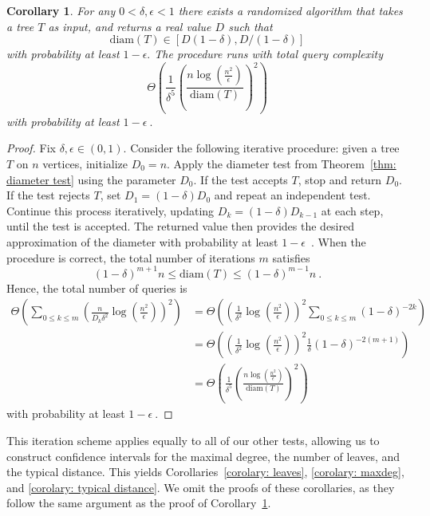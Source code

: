 \documentclass[12pt]{article}
\newtheorem{corollary}[theorem]{Corollary}
\newcommand{\diam}[1]{\mathrm{diam}\!\left(#1\right)}
\begin{document}
\begin{corollary}\label{corolary: diameter}
    For any  $0<\delta,\epsilon<1$ there exists a randomized algorithm that takes a tree $T$ as input, and returns a real value $D$ such that $$\diam{T}\in [D(1-\delta),D/(1-\delta)]$$ with probability at least $1-\epsilon.$ The procedure runs with total query complexity $$\Theta\left(\frac{1}{\delta^5}\left(\frac{n\log(\frac{n^2}{\epsilon})}{\diam{T}}\right)^2\right)$$
    with probability at least $1-\epsilon~.$
\end{corollary}
\begin{proof}
    Fix $\delta,\epsilon \in (0,1)$. Consider the following iterative procedure: given a tree $T$ on $n$ vertices, initialize $D_0 = n$. Apply the diameter test from Theorem~\ref{thm: diameter test} using the parameter $D_0$. If the test accepts $T$, stop and return $D_0$. If the test rejects $T$, set $D_1 = (1-\delta) D_0$ and repeat an independent test. Continue this process iteratively, updating $D_k = (1-\delta) D_{k-1}$ at each step, until the test is accepted. The returned value then provides the desired approximation of the diameter with probability at least $1-\epsilon$~.
    When the procedure is correct, the total number of iterations $m$ satisfies
    \[
    (1-\delta)^{m+1}n\le \diam{T} \le (1-\delta)^{m-1} n~.
    \]
    Hence, the total number of queries is 
    \begin{align*}
    \Theta\left(
    \sum_{0\le k \le m} \left(
    \frac{n}{D_k\delta^2}\log\left(\frac{n^2}{\epsilon} \right)
    \right)^2
    \right)
    &= 
    \Theta\left(
    \left(
    \frac{1}{\delta^2}\log\left(\frac{n^2}{\epsilon} \right)
    \right)^2\sum_{0\le k \le m} (1-\delta)^{-2k}
    \right) \\
    &= \Theta\left(
    \left(
    \frac{1}{\delta^2}\log\left(\frac{n^2}{\epsilon} \right)
    \right)^2\frac{1}{\delta}(1-\delta)^{-2(m+1)}
    \right) \\
    &= \Theta\left(\frac{1}{\delta^5}\left(\frac{n\log(\frac{n^2}{\epsilon})}{\diam{T}}\right)^2\right)
    \end{align*}
    with probability at least $1-\epsilon~.$
\end{proof}

This iteration scheme applies equally to all of our other tests, allowing us to construct confidence intervals for the maximal degree, the number of leaves, and the typical distance. This yields Corollaries~\ref{corolary: leaves}, \ref{corolary: maxdeg}, and \ref{corolary: typical distance}. 
We omit the proofs of these corollaries, as they follow the same argument as the proof of Corollary~\ref{corolary: diameter}.
\end{document}
